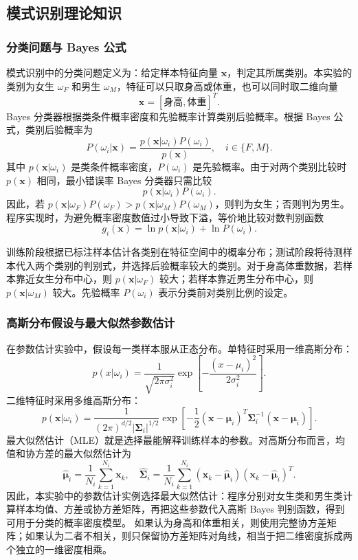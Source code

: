 \documentclass[UTF8,a4paper,12pt]{ctexart}
\begin{document}
\subsection{模式识别理论知识}

\subsubsection{分类问题与 Bayes 公式}

模式识别中的分类问题定义为：给定样本特征向量 $\boldsymbol{x}$，判定其所属类别。本实验的类别为女生 $\omega_F$ 和男生 $\omega_M$，特征可以只取身高或体重，也可以同时取二维向量
\[
\boldsymbol{x} = [\text{身高},\text{体重}]^T .
\]
Bayes 分类器根据类条件概率密度和先验概率计算类别后验概率。根据 Bayes 公式，类别后验概率为
\[
P(\omega_i|\boldsymbol{x}) = \frac{p(\boldsymbol{x}|\omega_i)P(\omega_i)}{p(\boldsymbol{x})},\quad i\in\{F,M\}.
\]
其中 $p(\boldsymbol{x}|\omega_i)$ 是类条件概率密度，$P(\omega_i)$ 是先验概率。由于对两个类别比较时 $p(\boldsymbol{x})$ 相同，最小错误率 Bayes 分类器只需比较
\[
p(\boldsymbol{x}|\omega_i)P(\omega_i).
\]
因此，若 $p(\boldsymbol{x}|\omega_F)P(\omega_F)>p(\boldsymbol{x}|\omega_M)P(\omega_M)$，则判为女生；否则判为男生。程序实现时，为避免概率密度数值过小导致下溢，等价地比较对数判别函数
\[
g_i(\boldsymbol{x}) = \ln p(\boldsymbol{x}|\omega_i)+\ln P(\omega_i).
\]

训练阶段根据已标注样本估计各类别在特征空间中的概率分布；测试阶段将待测样本代入两个类别的判别式，并选择后验概率较大的类别。对于身高体重数据，若样本靠近女生分布中心，则 $p(\boldsymbol{x}|\omega_F)$ 较大；若样本靠近男生分布中心，则 $p(\boldsymbol{x}|\omega_M)$ 较大。先验概率 $P(\omega_i)$ 表示分类前对类别比例的设定。

\subsubsection{高斯分布假设与最大似然参数估计}

在参数估计实验中，假设每一类样本服从正态分布。单特征时采用一维高斯分布：
\[
p(x|\omega_i)=\frac{1}{\sqrt{2\pi\sigma_i^2}}\exp\left[-\frac{(x-\mu_i)^2}{2\sigma_i^2}\right].
\]
二维特征时采用多维高斯分布：
\[
p(\boldsymbol{x}|\omega_i)=\frac{1}{(2\pi)^{d/2}|\boldsymbol{\Sigma}_i|^{1/2}}
\exp\left[-\frac{1}{2}(\boldsymbol{x}-\boldsymbol{\mu}_i)^T\boldsymbol{\Sigma}_i^{-1}(\boldsymbol{x}-\boldsymbol{\mu}_i)\right].
\]
最大似然估计（MLE）就是选择最能解释训练样本的参数。对高斯分布而言，均值和协方差的最大似然估计为
\[
\hat{\boldsymbol{\mu}}_i=\frac{1}{N_i}\sum_{k=1}^{N_i}\boldsymbol{x}_k,
\quad
\hat{\boldsymbol{\Sigma}}_i=\frac{1}{N_i}\sum_{k=1}^{N_i}(\boldsymbol{x}_k-\hat{\boldsymbol{\mu}}_i)(\boldsymbol{x}_k-\hat{\boldsymbol{\mu}}_i)^T.
\]
因此，本实验中的参数估计实例选择最大似然估计：程序分别对女生类和男生类计算样本均值、方差或协方差矩阵，再把这些参数代入高斯 Bayes 判别函数，得到可用于分类的概率密度模型。
如果认为身高和体重相关，则使用完整协方差矩阵；如果认为二者不相关，则只保留协方差矩阵对角线，相当于把二维密度拆成两个独立的一维密度相乘。
\end{document}
